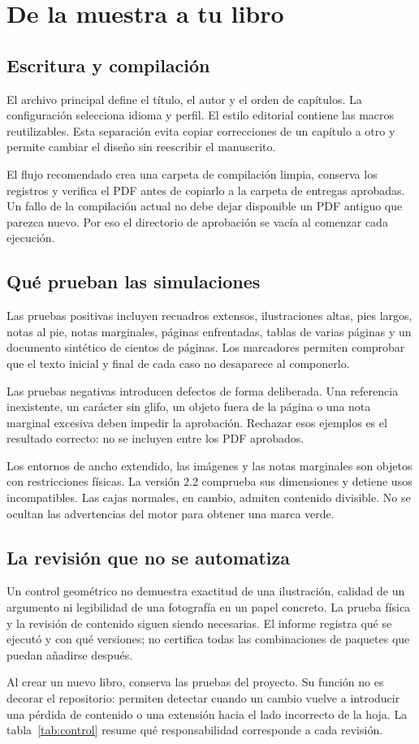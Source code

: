 \chapter{De la muestra a tu libro}
\section{Escritura y compilación}
El archivo principal define el título, el autor y el orden de capítulos. La configuración selecciona idioma y perfil. El estilo editorial contiene las macros reutilizables. Esta separación evita copiar correcciones de un capítulo a otro y permite cambiar el diseño sin reescribir el manuscrito.

El flujo recomendado crea una carpeta de compilación limpia, conserva los registros y verifica el PDF antes de copiarlo a la carpeta de entregas aprobadas. Un fallo de la compilación actual no debe dejar disponible un PDF antiguo que parezca nuevo. Por eso el directorio de aprobación se vacía al comenzar cada ejecución.

\section{Qué prueban las simulaciones}
Las pruebas positivas incluyen recuadros extensos, ilustraciones altas, pies largos, notas al pie, notas marginales, páginas enfrentadas, tablas de varias páginas y un documento sintético de cientos de páginas. Los marcadores permiten comprobar que el texto inicial y final de cada caso no desaparece al componerlo.

Las pruebas negativas introducen defectos de forma deliberada. Una referencia inexistente, un carácter sin glifo, un objeto fuera de la página o una nota marginal excesiva deben impedir la aprobación. Rechazar esos ejemplos es el resultado correcto: no se incluyen entre los PDF aprobados.

\begin{technicalbox}
Los entornos de ancho extendido, las imágenes y las notas marginales son objetos con restricciones físicas. La versión 2.2 comprueba sus dimensiones y detiene usos incompatibles. Las cajas normales, en cambio, admiten contenido divisible. No se ocultan las advertencias del motor para obtener una marca verde.
\end{technicalbox}

\section{La revisión que no se automatiza}
Un control geométrico no demuestra exactitud de una ilustración, calidad de un argumento ni legibilidad de una fotografía en un papel concreto. La prueba física y la revisión de contenido siguen siendo necesarias. El informe registra qué se ejecutó y con qué versiones; no certifica todas las combinaciones de paquetes que puedan añadirse después.

Al crear un nuevo libro, conserva las pruebas del proyecto. Su función no es decorar el repositorio: permiten detectar cuando un cambio vuelve a introducir una pérdida de contenido o una extensión hacia el lado incorrecto de la hoja. La tabla~\ref{tab:control} resume qué responsabilidad corresponde a cada revisión.
